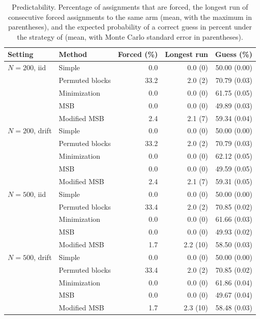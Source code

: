 \documentclass[bib]{statapress}
\begin{document}
\begin{table}[htbp]
\centering
\footnotesize
\caption{Predictability. Percentage of assignments that are forced, the longest
run of consecutive forced assignments to the same arm (mean, with the maximum in
parentheses), and the expected probability of a correct guess in percent under
the strategy of \citet{blackwell1957} (mean, with Monte Carlo standard error in
parentheses).}
\label{tab:predictability}
\begin{tabular}{llrrr}
\hline
Setting & Method & Forced (\%) & Longest run & Guess (\%) \\
\hline
$N=200$, iid & Simple & 0.0 & 0.0 (0) & 50.00 (0.00) \\
 & Permuted blocks & 33.2 & 2.0 (2) & 70.79 (0.03) \\
 & Minimization & 0.0 & 0.0 (0) & 61.75 (0.05) \\
 & MSB & 0.0 & 0.0 (0) & 49.89 (0.03) \\
 & Modified MSB & 2.4 & 2.1 (7) & 59.34 (0.04) \\
$N=200$, drift & Simple & 0.0 & 0.0 (0) & 50.00 (0.00) \\
 & Permuted blocks & 33.2 & 2.0 (2) & 70.79 (0.03) \\
 & Minimization & 0.0 & 0.0 (0) & 62.12 (0.05) \\
 & MSB & 0.0 & 0.0 (0) & 49.59 (0.05) \\
 & Modified MSB & 2.4 & 2.1 (7) & 59.31 (0.05) \\
$N=500$, iid & Simple & 0.0 & 0.0 (0) & 50.00 (0.00) \\
 & Permuted blocks & 33.4 & 2.0 (2) & 70.85 (0.02) \\
 & Minimization & 0.0 & 0.0 (0) & 61.66 (0.03) \\
 & MSB & 0.0 & 0.0 (0) & 49.93 (0.02) \\
 & Modified MSB & 1.7 & 2.2 (10) & 58.50 (0.03) \\
$N=500$, drift & Simple & 0.0 & 0.0 (0) & 50.00 (0.00) \\
 & Permuted blocks & 33.4 & 2.0 (2) & 70.85 (0.02) \\
 & Minimization & 0.0 & 0.0 (0) & 61.86 (0.04) \\
 & MSB & 0.0 & 0.0 (0) & 49.67 (0.04) \\
 & Modified MSB & 1.7 & 2.3 (10) & 58.48 (0.03) \\
\hline
\end{tabular}
\end{table}
\end{document}

